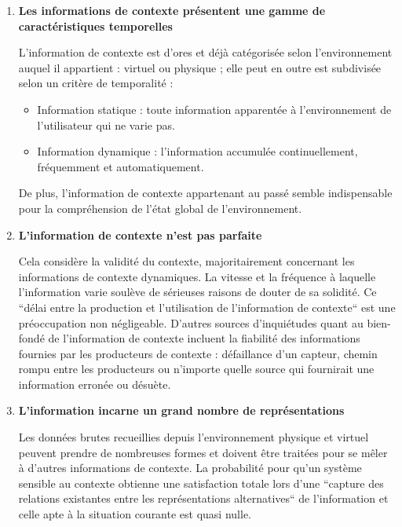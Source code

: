 \begin{enumerate}
    \item \textbf{Les informations de contexte présentent une gamme de
        caractéristiques temporelles}

        L'information de contexte est d'ores et déjà catégorisée selon
        l'environnement auquel il appartient : virtuel ou physique ; elle
        peut en outre est subdivisée selon un critère de temporalité :

        \begin{itemize}
            \item Information statique : toute information apparentée à
            	l'environnement de l'utilisateur qui ne varie pas.
            \item Information dynamique : l'information accumulée
            	continuellement, fréquemment et automatiquement.
        \end{itemize}

        De plus, l'information de contexte appartenant au passé semble
        indispensable pour la compréhension de l'état global de l'environnement.

    \item \textbf{L'information de contexte n'est pas parfaite}

        Cela considère la validité du contexte, majoritairement concernant
        les informations de contexte dynamiques. La vitesse et la fréquence à
        laquelle l'information varie soulève de sérieuses raisons de
        douter de sa solidité. Ce ``délai entre la production et
        l'utilisation de l'information de contexte``
        \cite{catharina_context_2002} est une préoccupation non négligeable.
        D'autres sources d'inquiétudes quant au bien-fondé de l'information de
        contexte incluent la fiabilité des informations fournies par les
        producteurs de contexte : défaillance d'un capteur, chemin rompu entre
        les producteurs ou n'importe quelle source qui fournirait une
        information erronée ou désuète.

    \item \textbf{L'information incarne un grand nombre de représentations}

        Les données brutes recueillies depuis l'environnement physique et
        virtuel peuvent prendre de nombreuses formes et doivent être traitées
        pour se mêler à d'autres informations de contexte. La probabilité pour
        qu'un système sensible au contexte obtienne une satisfaction totale
        lors d'une ``capture des relations existantes entre les représentations
        alternatives`` \cite{catharina_context_2002}  de l'information et celle
        apte à la situation courante est quasi nulle.


\end{enumerate}
